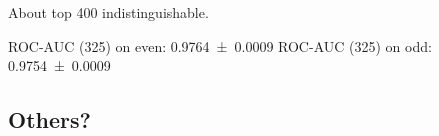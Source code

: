 About top 400 indistinguishable.

ROC-AUC (325) on even: \num{0.9764 +- 0.0009} ROC-AUC (325) on odd:
\num{0.9754 +- 0.0009}






\subsection{Others?}



